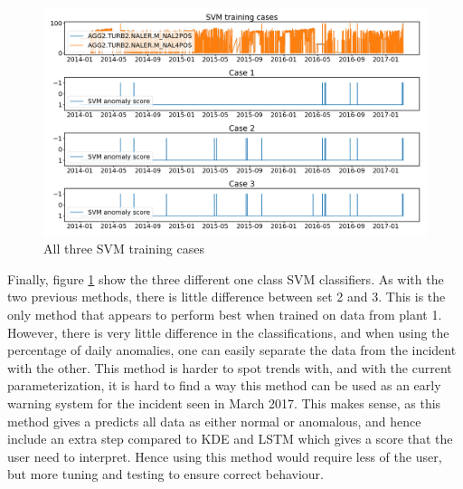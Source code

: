         \begin{figure}[h!]
            \centering
            \includegraphics[width=\textwidth]{report/figures/analysis/training_cases/svm_training_cases.png}
            \caption{All three SVM training cases}
            \label{fig:svm_training_cases}
        \end{figure}
        Finally, figure \ref{fig:svm_training_cases} show the three different one class SVM classifiers. As with the two previous methods, there is little difference between set 2 and 3. This is the only method that appears to perform best when trained on data from plant 1. However, there is very little difference in the classifications, and when using the percentage of daily anomalies, one can easily separate the data from the incident with the other. This method is harder to spot trends with, and with the current parameterization, it is hard to find a way this method can be used as an early warning system for the incident seen in March 2017. This makes sense, as this method gives a predicts all data as either normal or anomalous, and hence include an extra step compared to KDE and LSTM which gives a score that the user need to interpret. Hence using this method would require less of the user, but more tuning and testing to ensure correct behaviour. 
        
    
    
    
    
    
    
    
    
    
    
    
    
    
    
    
    
    
    
    
    
